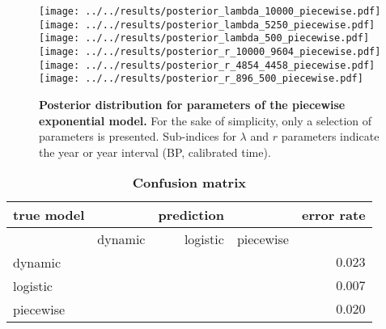 \documentclass[a4paper]{article}
\begin{document}
\begin{figure}[h]
\begin{center}
\texttt{[image: ../../results/posterior\_lambda\_10000\_piecewise.pdf]}\texttt{[image: ../../results/posterior\_lambda\_5250\_piecewise.pdf]}\texttt{[image: ../../results/posterior\_lambda\_500\_piecewise.pdf]}
\texttt{[image: ../../results/posterior\_r\_10000\_9604\_piecewise.pdf]}\texttt{[image: ../../results/posterior\_r\_4854\_4458\_piecewise.pdf]}\texttt{[image: ../../results/posterior\_r\_896\_500\_piecewise.pdf]}
\end{center}
\caption{\textbf{Posterior distribution for parameters of the piecewise exponential model.} For the sake of simplicity, only a selection of parameters is presented. Sub-indices for $\lambda$ and $r$ parameters indicate the year or year interval (BP, calibrated time).}
\label{fig:posterior_dynamic}
\end{figure}



\begin{table}[tbh]
\caption{\textbf{Confusion matrix}}
\label{tab:confusion_matrix}
\small
\begin{tabular}{lrrrr}
\hline
true model &         & prediction &           & error rate \\
\hline\hline
           & dynamic & logistic   & piecewise &  \\
\hline
dynamic    &    \cellcolor{pciblue!92.640!white!100}{$92640$} &        \cellcolor{pciblue!0.768!white!100}{$768$} &      \cellcolor{pciblue!1.388!white!100}{$1388$} &      $0.023$ \\
logistic   &      \cellcolor{pciblue!0.044!white!100}{$44$} &      \cellcolor{pciblue!99.292!white!100}{$99292$} &       \cellcolor{pciblue!0.664!white!100}{$664$} &      $0.007$ \\
piecewise  &     \cellcolor{pciblue!0.545!white!100}{$545$} &       \cellcolor{pciblue!1.423!white!100}{$1423$} &     \cellcolor{pciblue!98.032!white!100}{$98032$} &      $0.020$ \\
\hline%
\end{tabular}
\end{table}
\end{document}
